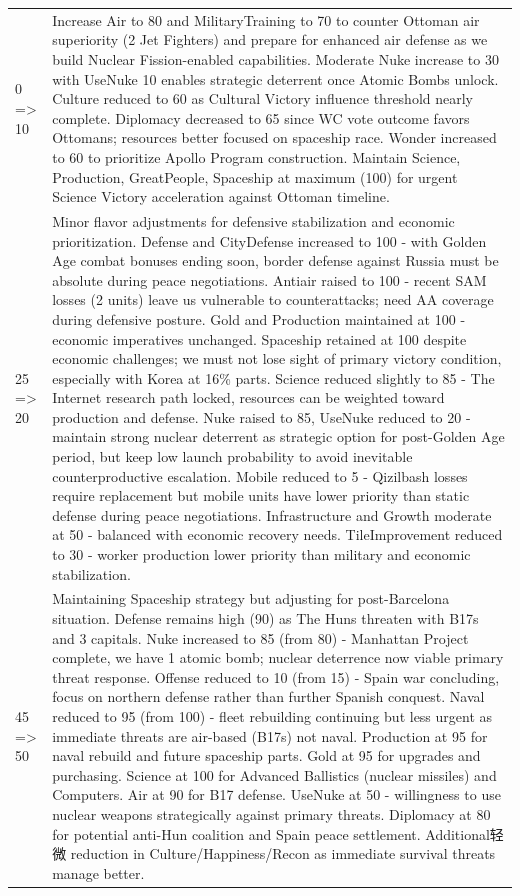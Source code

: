 \begin{longtable}{p{}p{}}
0 => 10 & Increase Air to 80 and MilitaryTraining to 70 to counter Ottoman air superiority (2 Jet Fighters) and prepare for enhanced air defense as we build Nuclear Fission-enabled capabilities. Moderate Nuke increase to 30 with UseNuke 10 enables strategic deterrent once Atomic Bombs unlock. Culture reduced to 60 as Cultural Victory influence threshold nearly complete. Diplomacy decreased to 65 since WC vote outcome favors Ottomans; resources better focused on spaceship race. Wonder increased to 60 to prioritize Apollo Program construction. Maintain Science, Production, GreatPeople, Spaceship at maximum (100) for urgent Science Victory acceleration against Ottoman timeline. \\
25 => 20 & Minor flavor adjustments for defensive stabilization and economic prioritization. Defense and CityDefense increased to 100 - with Golden Age combat bonuses ending soon, border defense against Russia must be absolute during peace negotiations. Antiair raised to 100 - recent SAM losses (2 units) leave us vulnerable to counterattacks; need AA coverage during defensive posture. Gold and Production maintained at 100 - economic imperatives unchanged. Spaceship retained at 100 despite economic challenges; we must not lose sight of primary victory condition, especially with Korea at 16\% parts. Science reduced slightly to 85 - The Internet research path locked, resources can be weighted toward production and defense. Nuke raised to 85, UseNuke reduced to 20 - maintain strong nuclear deterrent as strategic option for post-Golden Age period, but keep low launch probability to avoid inevitable counterproductive escalation. Mobile reduced to 5 - Qizilbash losses require replacement but mobile units have lower priority than static defense during peace negotiations. Infrastructure and Growth moderate at 50 - balanced with economic recovery needs. TileImprovement reduced to 30 - worker production lower priority than military and economic stabilization. \\
45 => 50 & Maintaining Spaceship strategy but adjusting for post-Barcelona situation. Defense remains high (90) as The Huns threaten with B17s and 3 capitals. Nuke increased to 85 (from 80) - Manhattan Project complete, we have 1 atomic bomb; nuclear deterrence now viable primary threat response. Offense reduced to 10 (from 15) - Spain war concluding, focus on northern defense rather than further Spanish conquest. Naval reduced to 95 (from 100) - fleet rebuilding continuing but less urgent as immediate threats are air-based (B17s) not naval. Production at 95 for naval rebuild and future spaceship parts. Gold at 95 for upgrades and purchasing. Science at 100 for Advanced Ballistics (nuclear missiles) and Computers. Air at 90 for B17 defense. UseNuke at 50 - willingness to use nuclear weapons strategically against primary threats. Diplomacy at 80 for potential anti-Hun coalition and Spain peace settlement. Additional轻微 reduction in Culture/Happiness/Recon as immediate survival threats manage better. \\

\end{longtable}
